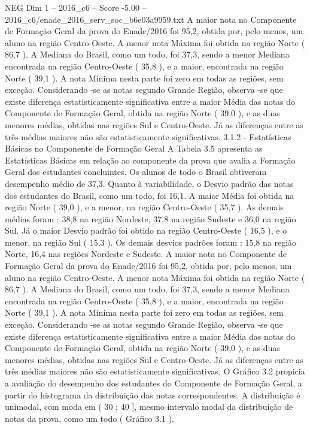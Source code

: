 \begin{textsample}{NEG Dim 1 – 2016\_c6 – Score -5.00 – 2016\_c6/enade\_2016\_serv\_soc\_b6e03a9959.txt}
A maior nota no Componente de Formação Geral da prova do Enade/2016 foi 95,2, obtida por, pelo menos, um aluno na região Centro-Oeste.
A menor nota Máxima foi obtida na região Norte ( 86,7 ).
A Mediana do Brasil, como um todo, foi 37,3, sendo a menor Mediana encontrada na região Centro-Oeste ( 35,8 ), e a maior, encontrada na região Norte ( 39,1 ).
A nota Mínima nesta parte foi zero em todas as regiões, sem exceção.
Considerando -se as notas segundo Grande Região, observa -se que existe diferença estatisticamente significativa entre a maior Média das notas do Componente de Formação Geral, obtida na região Norte ( 39,0 ), e as duas menores médias, obtidas nas regiões Sul e Centro-Oeste.
Já as diferenças entre as três médias maiores não são estatisticamente significativas. 3.1.2 - Estatísticas Básicas no Componente de Formação Geral A Tabela 3.5 apresenta as Estatísticas Básicas em relação ao componente da prova que avalia a Formação Geral dos estudantes concluintes.
Os alunos de todo o Brasil obtiveram desempenho médio de 37,3.
Quanto à variabilidade, o Desvio padrão das notas dos estudantes do Brasil, como um todo, foi 16,1.
A maior Média foi obtida na região Norte ( 39,0 ), e a menor, na região Centro-Oeste ( 35,7 ).
As demais médias foram : 38,8 na região Nordeste, 37,8 na região Sudeste e 36,0 na região Sul.
Já o maior Desvio padrão foi obtido na região Centro-Oeste ( 16,5 ), e o menor, na região Sul ( 15,3 ).
Os demais desvios padrões foram : 15,8 na região Norte, 16,4 nas regiões Nordeste e Sudeste.
A maior nota no Componente de Formação Geral da prova do Enade/2016 foi 95,2, obtida por, pelo menos, um aluno na região Centro-Oeste.
A menor nota Máxima foi obtida na região Norte ( 86,7 ).
A Mediana do Brasil, como um todo, foi 37,3, sendo a menor Mediana encontrada na região Centro-Oeste ( 35,8 ), e a maior, encontrada na região Norte ( 39,1 ).
A nota Mínima nesta parte foi zero em todas as regiões, sem exceção.
Considerando -se as notas segundo Grande Região, observa -se que existe diferença estatisticamente significativa entre a maior Média das notas do Componente de Formação Geral, obtida na região Norte ( 39,0 ), e as duas menores médias, obtidas nas regiões Sul e Centro-Oeste.
Já as diferenças entre as três médias maiores não são estatisticamente significativas.
O Gráfico 3.2 propicia a avaliação do desempenho dos estudantes do Componente de Formação Geral, a partir do histograma da distribuição das notas correspondentes.
A distribuição é unimodal, com moda em ( 30 ; 40 ], mesmo intervalo modal da distribuição de notas da prova, como um todo ( Gráfico 3.1 ).

\end{textsample}
